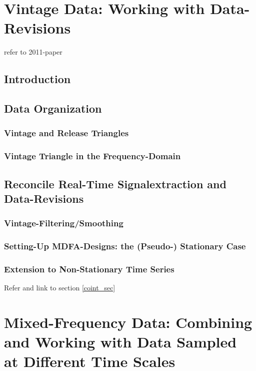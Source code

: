 \documentclass[a4paper]{book}
\begin{document}
\chapter{Vintage Data: Working with Data-Revisions}\label{rev_sec}

refer to 2011-paper
\section{Introduction}

\section{Data Organization}

\subsection{Vintage and Release Triangles}

\subsection{Vintage Triangle in the Frequency-Domain}


\section{Reconcile Real-Time Signalextraction and Data-Revisions}

\subsection{Vintage-Filtering/Smoothing}

\subsection{Setting-Up MDFA-Designs: the (Pseudo-) Stationary Case}

\subsection{Extension to Non-Stationary Time Series}\label{rev_sec_int}

Refer and link to section \ref{coint_sec}






\chapter{Mixed-Frequency Data: Combining and Working with Data Sampled at Different Time Scales}\label{mix_sec}
\end{document}
